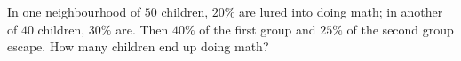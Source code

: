 In one neighbourhood of $50$ children, $20\%$ are lured into doing math; in another of $40$ children, $30\%$ are. Then $40\%$ of the first group and $25\%$ of the second group escape. How many children end up doing math?
